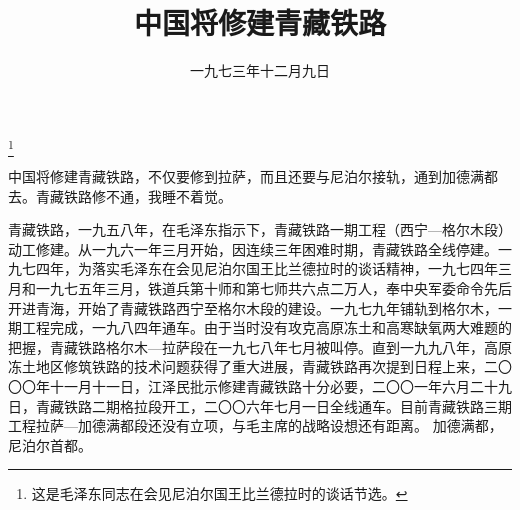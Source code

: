 
\title{中国将修建青藏铁路}
\date{一九七三年十二月九日}
\thanks{这是毛泽东同志在会见尼泊尔国王比兰德拉时的谈话节选。}
\maketitle


中国将修建青藏铁路，不仅要修到拉萨，而且还要与尼泊尔接轨，通到加德满都去。青藏铁路修不通，我睡不着觉。

\begin{maonote}
青藏铁路，一九五八年，在毛泽东指示下，青藏铁路一期工程（西宁—格尔木段）动工修建。从一九六一年三月开始，因连续三年困难时期，青藏铁路全线停建。一九七四年，为落实毛泽东在会见尼泊尔国王比兰德拉时的谈话精神，一九七四年三月和一九七五年三月，铁道兵第十师和第七师共六点二万人，奉中央军委命令先后开进青海，开始了青藏铁路西宁至格尔木段的建设。一九七九年铺轨到格尔木，一期工程完成，一九八四年通车。由于当时没有攻克高原冻土和高寒缺氧两大难题的把握，青藏铁路格尔木—拉萨段在一九七八年七月被叫停。直到一九九八年，高原冻土地区修筑铁路的技术问题获得了重大进展，青藏铁路再次提到日程上来，二〇〇〇年十一月十一日，江泽民批示修建青藏铁路十分必要，二〇〇一年六月二十九日，青藏铁路二期格拉段开工，二〇〇六年七月一日全线通车。目前青藏铁路三期工程拉萨—加德满都段还没有立项，与毛主席的战略设想还有距离。
加德满都，尼泊尔首都。
\end{maonote}
